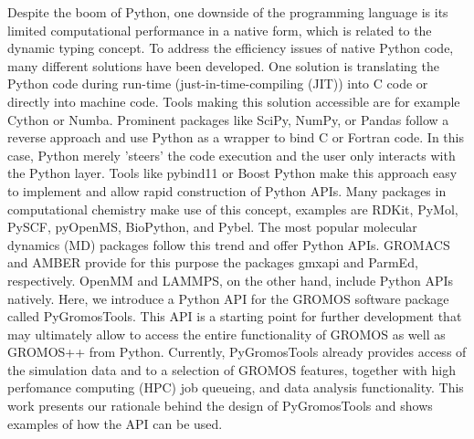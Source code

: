 Despite the boom of Python, one downside of the programming language is its limited computational performance in a native form, which is related to the dynamic typing concept. To address the efficiency issues of native Python code, many different solutions have been developed. One solution is translating the Python code during run-time (just-in-time-compiling (JIT)) into C code\cite{Kernighan2006} or directly into machine code\cite{Lattner2008}. Tools making this solution accessible are for example Cython\cite{Behnel2011} or Numba\cite{Lam2015}. 
Prominent packages like SciPy\cite{Vanderwalt2011}, NumPy\cite{Virtanen2020}, or Pandas\cite{Mckinney2010} follow a reverse approach and use Python as a wrapper to bind C\cite{Kernighan2006} or Fortran\cite{Backus1957} code. In this case, Python merely 'steers' the code execution and the user only interacts with the Python layer.\cite{Oliphant2007} 
Tools like pybind11\cite{Wenzel2017} or Boost Python\cite{Koranne2011} make this approach easy to implement and allow rapid construction of Python APIs. 
Many packages in computational chemistry make use of this concept, examples are RDKit\cite{Landrum2021}, PyMol\cite{Delano2020}, PySCF\cite{Sun2018}, pyOpenMS\cite{Röst2014}, BioPython\cite{Cock2009}, and Pybel\cite{O'Boyle2008}. The most popular molecular dynamics (MD) packages follow this trend and offer Python APIs. GROMACS \cite{Berendsen1995, Lindahl2001, Vanderspoel2005, Hess2008, Pall2015, Pronk2013, Abraham2015} and AMBER\cite{Case2005} provide for this purpose the packages gmxapi\cite{Irrgang2018} and ParmEd\cite{Shirts2017}, respectively. OpenMM\cite{Eastman2017} and LAMMPS,\cite{Thompson2022} on the other hand, include Python APIs natively.\cite{Talirz2021}
Here, we introduce a Python API for the GROMOS software package \cite{Schmid2012} called PyGromosTools.\cite{Lehner2021} This API is a starting point for further development that may ultimately allow to access the entire functionality of GROMOS as well as GROMOS++ \cite{Eichenberger2011} from Python. Currently, PyGromosTools already provides access of the simulation data and to a selection of GROMOS features, together with high perfomance computing (HPC) job queueing, and data analysis functionality. This work presents our rationale behind the design of PyGromosTools and shows examples of how the API can be used.


